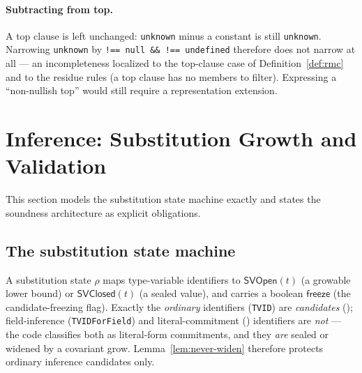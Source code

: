 \documentclass[11pt]{article}
\newcommand{\SVOpen}{\mathsf{SVOpen}}
\newcommand{\SVClosed}{\mathsf{SVClosed}}
\begin{document}
\paragraph{Subtracting from top.}
A top clause is left unchanged: \texttt{unknown} minus a constant is still
\texttt{unknown}. Narrowing \texttt{unknown} by
\texttt{!== null \&\& !== undefined} therefore does not narrow at all —
an incompleteness localized to the top-clause case of
Definition~\ref{def:rmc} and to the residue rules (a top clause has no
members to filter). Expressing a ``non-nullish top''
would still require a representation extension.

\section{Inference: Substitution Growth and Validation}
\label{sec:inference}

This section models the substitution state machine exactly and states the
soundness architecture as explicit obligations.

\subsection{The substitution state machine}

\begin{definition}
\label{def:subst}
A substitution state $\rho$ maps type-variable identifiers to
$\SVOpen(t)$ (a growable lower bound) or $\SVClosed(t)$ (a sealed value),
and carries a boolean $\mathsf{freeze}$ (the candidate-freezing flag).
Exactly the \emph{ordinary} identifiers (\texttt{TVID}) are
\emph{candidates} (); field-inference
(\texttt{TVIDForField}) and literal-commitment
() identifiers are \emph{not} — the code
classifies both as literal-form commitments, and they \emph{are} sealed or
widened by a covariant grow. Lemma~\ref{lem:never-widen} therefore protects
ordinary inference candidates only.
\end{definition}
\end{document}
